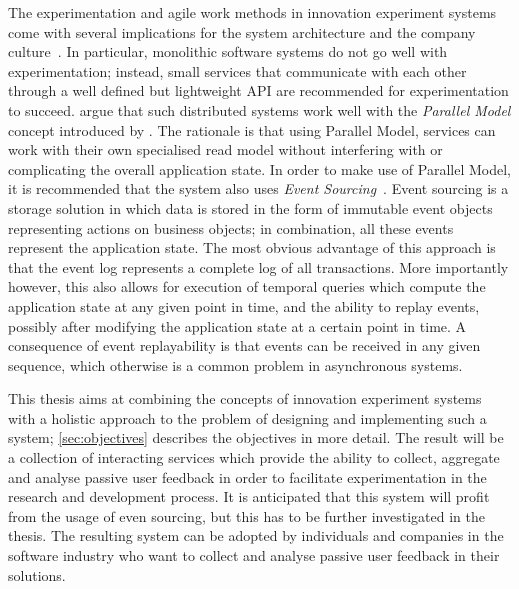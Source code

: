 The experimentation and agile work methods in innovation experiment systems come with several implications for the system architecture and the company culture~\cite{Lindgren2015,Olsson2012}.
In particular, monolithic software systems do not go well with experimentation; instead, small services that communicate with each other through a well defined but lightweight API are recommended for experimentation to succeed.
\citet{ford2017building} argue that such distributed systems work well with the \emph{Parallel Model} concept introduced by \citet{WEB:Fowler:2005-2}.
The rationale is that using Parallel Model, services can work with their own specialised read model without interfering with or complicating the overall application state.
In order to make use of Parallel Model, it is recommended that the system also uses \emph{Event Sourcing}~\cite{WEB:Fowler:2005,WEB:Fowler:2005-2}.
Event sourcing is a storage solution in which data is stored in the form of immutable event objects representing actions on business objects; in combination, all these events represent the application state.
The most obvious advantage of this approach is that the event log represents a complete log of all transactions.
More importantly however, this also allows for execution of temporal queries which compute the application state at any given point in time, and the ability to replay events, possibly after modifying the application state at a certain point in time.
A consequence of event replayability is that events can be received in any given sequence, which otherwise is a common problem in asynchronous systems.

This thesis aims at combining the concepts of innovation experiment systems with a holistic approach to the problem of designing and implementing such a system; \cref{sec:objectives} describes the objectives in more detail.
The result will be a collection of interacting services which provide the ability to collect, aggregate and analyse passive user feedback in order to facilitate experimentation in the research and development process.
It is anticipated that this system will profit from the usage of even sourcing, but this has to be further investigated in the thesis.
The resulting system can be adopted by individuals and companies in the software industry who want to collect and analyse passive user feedback in their solutions.
